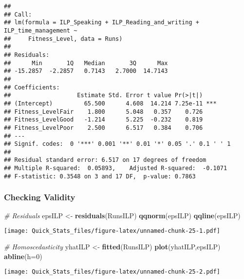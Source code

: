 \documentclass[]{article}
\newenvironment{Shaded}{\begin{snugshade}}{\end{snugshade}}
\newcommand{\KeywordTok}[1]{\textcolor[rgb]{0.13,0.29,0.53}{\textbf{#1}}}
\newcommand{\DataTypeTok}[1]{\textcolor[rgb]{0.13,0.29,0.53}{#1}}
\newcommand{\DecValTok}[1]{\textcolor[rgb]{0.00,0.00,0.81}{#1}}
\newcommand{\StringTok}[1]{\textcolor[rgb]{0.31,0.60,0.02}{#1}}
\newcommand{\CommentTok}[1]{\textcolor[rgb]{0.56,0.35,0.01}{\textit{#1}}}
\newcommand{\NormalTok}[1]{#1}
\begin{document}
\begin{verbatim}
## 
## Call:
## lm(formula = ILP_Speaking + ILP_Reading_and_writing + ILP_time_management ~ 
##     Fitness_Level, data = Runs)
## 
## Residuals:
##      Min       1Q   Median       3Q      Max 
## -15.2857  -2.2857   0.7143   2.7000  14.7143 
## 
## Coefficients:
##                   Estimate Std. Error t value Pr(>|t|)    
## (Intercept)         65.500      4.608  14.214 7.25e-11 ***
## Fitness_LevelFair    1.800      5.048   0.357    0.726    
## Fitness_LevelGood   -1.214      5.225  -0.232    0.819    
## Fitness_LevelPoor    2.500      6.517   0.384    0.706    
## ---
## Signif. codes:  0 '***' 0.001 '**' 0.01 '*' 0.05 '.' 0.1 ' ' 1
## 
## Residual standard error: 6.517 on 17 degrees of freedom
## Multiple R-squared:  0.05893,    Adjusted R-squared:  -0.1071 
## F-statistic: 0.3548 on 3 and 17 DF,  p-value: 0.7863
\end{verbatim}

\subsubsection{Checking Validity}\label{checking-validity-4}

\begin{Shaded}
\begin{Highlighting}[]
\CommentTok{# Residuals }
\NormalTok{epsILP <-}\StringTok{ }\KeywordTok{residuals}\NormalTok{(RunsILP) }
\KeywordTok{qqnorm}\NormalTok{(epsILP) }
\KeywordTok{qqline}\NormalTok{(epsILP) }
\end{Highlighting}
\end{Shaded}

\texttt{[image: Quick\_Stats\_files/figure-latex/unnamed-chunk-25-1.pdf]}

\begin{Shaded}
\begin{Highlighting}[]
\CommentTok{# Homoscedasticity }
\NormalTok{yhatILP <-}\StringTok{ }\KeywordTok{fitted}\NormalTok{(RunsILP) }
\KeywordTok{plot}\NormalTok{(yhatILP,epsILP) }
\KeywordTok{abline}\NormalTok{(}\DataTypeTok{h=}\DecValTok{0}\NormalTok{) }
\end{Highlighting}
\end{Shaded}

\texttt{[image: Quick\_Stats\_files/figure-latex/unnamed-chunk-25-2.pdf]}
\end{document}
